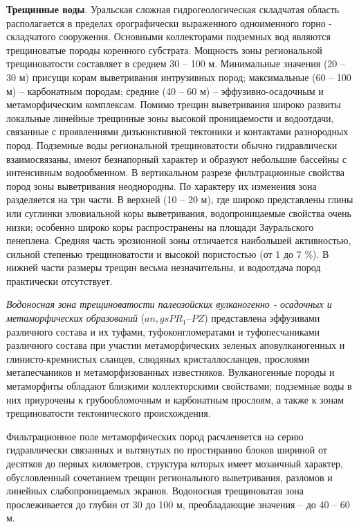 \textbf{Трещинные воды}. Уральская сложная гидрогеологическая складчатая область располагается в пределах орографически выраженного одноименного горно - складчатого сооружения. Основными коллекторами подземных вод являются трещиноватые породы коренного субстрата. Мощность зоны региональной трещиноватости составляет в среднем 30 – 100 м. Минимальные значения (20 – 30 м) присущи корам выветривания интрузивных пород; максимальные (60 – 100 м) – карбонатным породам; средние (40 – 60 м) – эффузивно-осадочным и метаморфическим комплексам. Помимо трещин выветривания широко развиты локальные линейные трещинные зоны высокой проницаемости и водоотдачи, связанные с проявлениями дизъюнктивной тектоники и контактами разнородных пород. Подземные воды региональной трещиноватости обычно гидравлически взаимосвязаны, имеют безнапорный характер и образуют небольшие бассейны с интенсивным водообменном. В вертикальном разрезе фильтрационные свойства пород зоны выветривания неоднородны. По характеру их изменения зона разделяется на три части. В верхней (10 – 20 м), где широко представлены глины или суглинки элювиальной коры выветривания, водопроницаемые свойства очень низки; особенно широко коры распространены на площади Зауральского пенеплена. Средняя часть эрозионной зоны отличается наибольшей активностью, сильной степенью трещиноватости и высокой пористостью (от 1 до 7 \%). В нижней части размеры трещин весьма незначительны, и водоотдача пород практически отсутствует.

\textit{Водоносная зона трещиноватости палеозойских вулканогенно - осадочных и метаморфических образований} ($an, gsPR_1–PZ$) представлена эффузивами различного состава и их туфами, туфоконгломератами и туфопесчаниками различного состава при участии метаморфических зеленых аповулканогенных и глинисто-кремнистых сланцев, слюдяных кристаллосланцев, прослоями метапесчаников и метаморфизованных известняков. Вулканогенные породы и метаморфиты обладают близкими коллекторскими свойствами; подземные воды в них приурочены к грубообломочным и карбонатным прослоям, а также к зонам трещиноватости тектонического происхождения. 

Фильтрационное поле метаморфических пород расчленяется на серию гидравлически связанных и вытянутых по простиранию блоков шириной от десятков до первых километров, структура которых имеет мозаичный характер, обусловленный сочетанием трещин регионального выветривания, разломов и линейных слабопроницаемых экранов. Водоносная трещиноватая зона прослеживается до глубин от 30 до 100 м, преобладающие значения – до 40 – 60 м.

